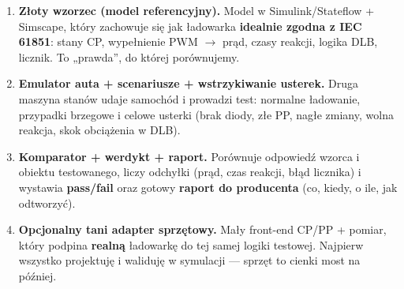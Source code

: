 \documentclass[11pt]{article}
\newcommand{\ra}{$\rightarrow$}
\newcommand{\key}[1]{\textbf{\color{navy}#1}}
\begin{document}
\begin{enumerate}
  \item \key{Złoty wzorzec (model referencyjny).} Model w Simulink/Stateflow + Simscape, który zachowuje się jak ładowarka \key{idealnie zgodna z IEC 61851}: stany CP, wypełnienie PWM \ra{} prąd, czasy reakcji, logika DLB, licznik. To „prawda'', do której porównujemy.
  \item \key{Emulator auta + scenariusze + wstrzykiwanie usterek.} Druga maszyna stanów udaje samochód i prowadzi test: normalne ładowanie, przypadki brzegowe i celowe usterki (brak diody, złe PP, nagłe zmiany, wolna reakcja, skok obciążenia w DLB).
  \item \key{Komparator + werdykt + raport.} Porównuje odpowiedź wzorca i obiektu testowanego, liczy odchyłki (prąd, czas reakcji, błąd licznika) i wystawia \key{pass/fail} oraz gotowy \key{raport do producenta} (co, kiedy, o ile, jak odtworzyć).
  \item \key{Opcjonalny tani adapter sprzętowy.} Mały front-end CP/PP + pomiar, który podpina \key{realną} ładowarkę do tej samej logiki testowej. Najpierw wszystko projektuję i waliduję w symulacji --- sprzęt to cienki most na później.
\end{enumerate}

\begin{center}
\end{center}
\end{document}
